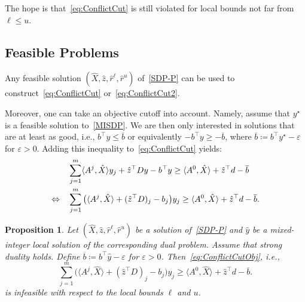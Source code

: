 \documentclass[10pt, a4paper]{article}
\newcommand{\define}{\coloneqq}
\newcommand{\skal}[2]{\langle{#1},{#2}\rangle}
\newcommand{\T}{^{\top}}
\newtheorem{proposition}[theorem]{Proposition}
\begin{document}
The hope is that~\eqref{eq:ConflictCut} is still violated for local bounds
not far from $\ell \leq u$.

\subsection{Feasible Problems}

Any feasible solution $(\hat{X}, \hat{z}, \hat{r}^\ell, \hat{r}^u)$
of~\eqref{SDP-P} can be used to construct~\eqref{eq:ConflictCut}
or~\eqref{eq:ConflictCut2}.

Moreover, one can take an objective cutoff into account. Namely, assume
that $y^\star$ is a feasible solution to~\eqref{MISDP}. We are then only
interested in solutions that are at least as good, i.e.,
$b\T y \leq \overline{b}$ or equivalently $- b\T y \geq - \overline{b}$,
where $\overline{b} \define b\T y^\star - \varepsilon$ for
$\varepsilon > 0$. Adding this inequality to~\eqref{eq:ConflictCut} yields:
\begin{align}
  & \sum_{j=1}^m \skal{A^j}{\hat{X}} y_j + \hat{z}\T D y - b\T y \geq
    \skal{A^0}{\hat{X}} + \hat{z}\T d - \overline{b}\notag\\
  \Leftrightarrow\quad
  & \sum_{j=1}^m \big(\skal{A^j}{\hat{X}} + (\hat{z}\T D)_j - b_j\big) y_j \geq
    \skal{A^0}{\hat{X}} + \hat{z}\T d - \overline{b}.\label{eq:ConflictCutObj}
\end{align}

\begin{proposition}
  Let $(\hat{X}, \hat{z}, \hat{r}^\ell, \hat{r}^u)$ be a solution
  of~\eqref{SDP-P} and $\hat{y}$ be a mixed-integer local solution of the
  corresponding dual problem. Assume that strong duality holds. Define
  $\overline{b} \define b\T \hat{y} - \varepsilon$ for $\varepsilon >
  0$. Then~\eqref{eq:ConflictCutObj}, i.e.,
  \[
    \sum_{j=1}^m \big(\skal{A^j}{\hat{X}} + (\hat{z}\T D)_j - b_j\big) y_j \geq
    \skal{A^0}{\hat{X}} + \hat{z}\T d - \overline{b}.
  \]
  is infeasible with respect to the local bounds $\ell$ and $u$.
\end{proposition}
\end{document}

